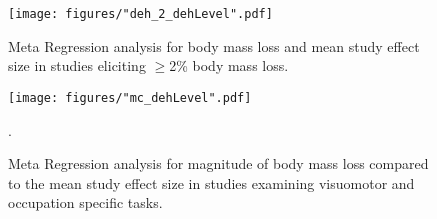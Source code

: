\begin{appendices}
\begin{figure}
	\centering
	\texttt{[image: figures/"deh\_2\_dehLevel".pdf]}
	\caption{Meta Regression analysis for body mass loss and mean study effect size in studies eliciting ${\geq}$2\% body mass loss.}
	\label{fig:deh_2_dehLevel}
\end{figure}

\begin{figure}
	\centering
	\texttt{[image: figures/"mc\_dehLevel".pdf]}
	\caption{Meta Regression analysis for magnitude of body mass loss compared to the mean study effect size in studies examining visuomotor and occupation specific tasks.}.
	\label{fig:mc_dehLevel}
\end{figure}


%
%
%





\end{appendices}
